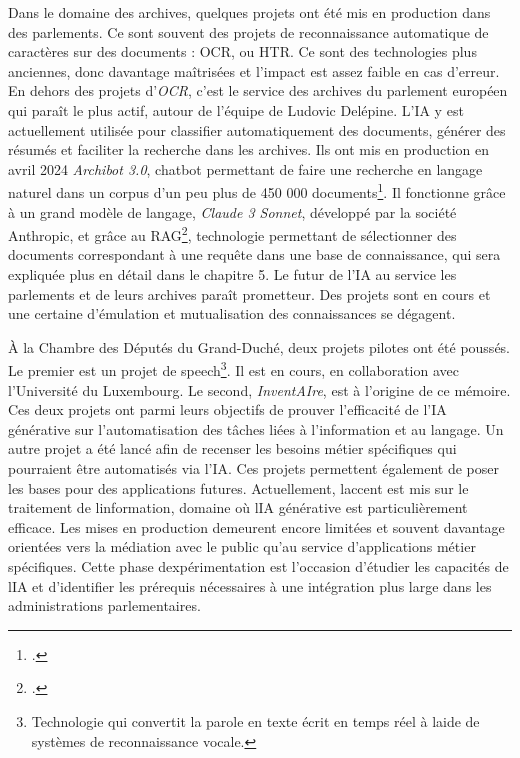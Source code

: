 Dans le domaine des archives, quelques projets ont été mis en production dans des parlements. Ce sont souvent des
projets de reconnaissance automatique de caractères sur des documents : \gls{OCR}, ou \gls{HTR}. Ce sont des technologies
plus anciennes, donc davantage maîtrisées et l'impact est assez faible
en cas d'erreur. En dehors des projets d'\emph{OCR}, c'est le service des
archives du parlement européen qui paraît le plus actif, autour de
l'équipe de Ludovic Delépine. L'IA y est actuellement utilisée pour
classifier automatiquement des documents, générer des résumés et
faciliter la recherche dans les archives. Ils ont mis en
production en avril 2024 \emph{Archibot 3.0}, \gls{chatbot} permettant de
faire une recherche en langage naturel dans un corpus d'un peu plus de
450 000 documents\footcite{kimaid_artificial_nodate}. Il fonctionne grâce à un grand modèle
de langage, \emph{Claude 3 Sonnet}, développé par la société
	Anthropic, et grâce au \gls{RAG}\footcite{kimaid_artificial_nodate}, technologie permettant de sélectionner des documents
	correspondant à une requête dans une base de connaissance, qui sera expliquée plus en détail dans le chapitre 5. Le futur de l'IA au service
les parlements et de leurs archives paraît prometteur. Des projets
sont en cours et une certaine d'émulation et mutualisation des
connaissances se dégagent.
\newline

À la Chambre des Députés du Grand-Duché, deux projets pilotes ont été poussés. 
Le premier est un projet de
\gls{speech}\footnote{Technologie qui convertit la parole en
	texte écrit en temps réel à l\textquotesingle aide de systèmes de
	reconnaissance vocale.}. Il est en cours, en collaboration avec
l'Université du Luxembourg. Le second, \emph{InventAIre}, est à l'origine de ce mémoire.
Ces deux projets ont
parmi leurs objectifs de prouver l'efficacité de l'IA générative sur
l'automatisation des tâches liées à l'information et au langage. Un
autre projet a été lancé afin de recenser les besoins métier spécifiques
qui pourraient être automatisés via l'IA. Ces projets permettent
également de poser les bases pour des applications futures. Actuellement,
l\textquotesingle accent est mis sur le traitement de
l\textquotesingle information, domaine où l\textquotesingle IA
générative est particulièrement efficace. Les mises en production
demeurent encore limitées et souvent davantage orientées vers la
médiation avec le public qu'au service d'applications métier
spécifiques. Cette phase d\textquotesingle expérimentation est
l'occasion d'étudier les capacités de l\textquotesingle IA et
d'identifier les prérequis nécessaires à une intégration plus large dans
les administrations parlementaires.\newline



